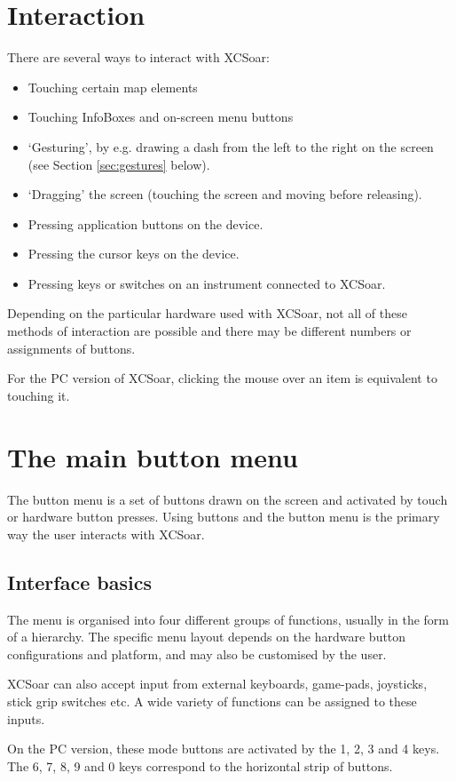 \section{Interaction}
There are several ways to interact with XCSoar:
\begin{itemize}
\item Touching certain map elements
\item Touching InfoBoxes and on-screen menu buttons
\item `Gesturing', by e.g. drawing a dash from the left to the right
  on the screen (see Section \ref{sec:gestures} below).
\item `Dragging' the screen (touching the screen and moving before releasing).
\item Pressing application buttons on the device.
\item Pressing the cursor keys on the device.
\item Pressing keys or switches on an instrument connected to XCSoar.
\end{itemize}
Depending on the particular hardware used with XCSoar, not all of these methods
of interaction are possible and there may be different numbers or assignments
of buttons.

For the PC version of XCSoar, clicking the mouse over an item is equivalent to
touching it.

\section{The main button menu}
The button menu is a set of buttons drawn on the screen and activated by touch
or hardware button presses.  Using buttons and the button menu is the primary
way the user interacts with XCSoar.

\subsection*{Interface basics}
The menu is organised into four different groups of functions, usually in
the form of a hierarchy.  The specific menu layout depends on the
hardware button configurations and platform, and may also be customised by the
user.

XCSoar can also accept input from external keyboards, game-pads, joysticks,
stick grip switches etc. A wide variety of functions can be assigned to these
inputs.

On the PC version, these mode buttons are activated by the
1, 2, 3 and 4 keys.  The 6, 7, 8, 9 and 0 keys correspond to the horizontal
strip of buttons.

